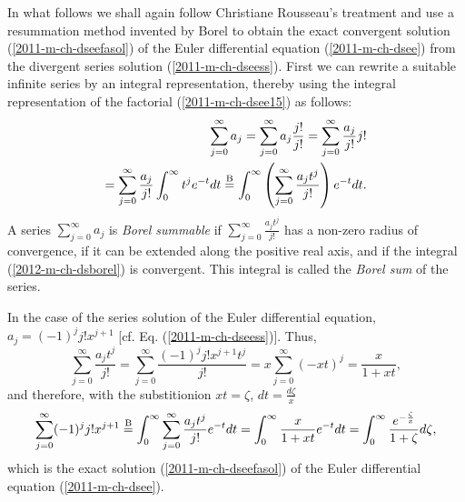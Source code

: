 In what follows we shall again follow Christiane Rousseau's treatment \cite{rousseau-2004}
and use a resummation method
invented by Borel \cite{Borel1899}
to obtain the exact convergent solution
(\ref{2011-m-ch-dseefasol})
of the Euler differential equation  (\ref{2011-m-ch-dsee})
from the divergent series solution (\ref{2011-m-ch-dseess}).
First we can rewrite a suitable infinite series by an integral representation,
thereby using the integral representation of the factorial (\ref{2011-m-ch-dsee15})
as follows:
\begin{equation}
\begin{split}
\sum_{j=0}^\infty
a_j
=
\sum_{j=0}^\infty
a_j  \frac{j!}{j!}
=
\sum_{j=0}^\infty
  \frac{a_j}{j!}  j!
\\
=
\sum_{j=0}^\infty
  \frac{a_j}{j!}  \int_0^\infty t^j e^{-t} dt
\stackrel{{\rm B}}{=}
\int_0^\infty \left(\sum_{j=0}^\infty   \frac{a_j t^j}{j!}\right)   e^{-t} dt
.
\end{split}
\label{2012-m-ch-dsborel}
\end{equation}
A series  $\sum_{j=0}^\infty   a_j $
is {\em Borel summable}
if $\sum_{j=0}^\infty   \frac{a_j t^j}{j!}$ has a non-zero radius of convergence,
if it can be extended along the positive real axis, and if the integral
(\ref{2012-m-ch-dsborel}) is convergent.
This integral is called the
{\em Borel sum}
of the series.

In the case of the series solution of the Euler differential equation, $a_j = (-1)^j j! x^{j+1}$
[cf. Eq. (\ref{2011-m-ch-dseess})].
Thus,
\begin{equation}
 \sum_{j=0}^\infty   \frac{a_j t^j}{j!}
=
 \sum_{j=0}^\infty   \frac{(-1)^j j! x^{j+1} t^j}{j!}
=
 x\sum_{j=0}^\infty   (-xt)^j =\frac{x}{1+xt},
\label{2012-m-ch-dsborelee}
\end{equation}
and therefore, with the substitionion $xt=\zeta$, $dt= \frac{d\zeta}{x}$
\begin{equation}
 \sum_{j=0}^\infty  (-1)^j j! x^{j+1}
\stackrel{{\rm B}}{=}
\int_0^\infty \sum_{j=0}^\infty   \frac{a_j t^j}{j!}   e^{-t} dt
 =
\int_0^\infty \frac{x}{1+xt}   e^{-t} dt
 =
\int_0^\infty \frac{e^{-\frac{\zeta}{x}}}{1+\zeta}    d\zeta,
\label{2012-m-ch-dsborelee1}
\end{equation}
which is the exact solution (\ref{2011-m-ch-dseefasol})
of the Euler differential equation  (\ref{2011-m-ch-dsee}).

